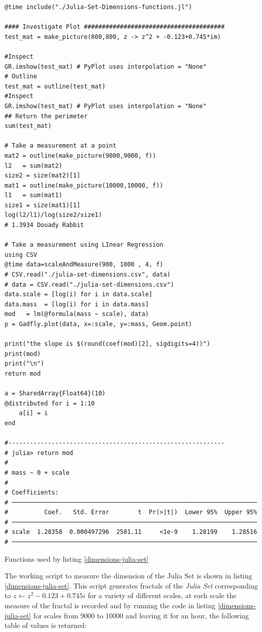 \documentclass[a4paper,11pt,twoside]{article}
\begin{document}
\newpage
\begin{listing}[htbp]
\begin{verbatim}
@time include("./Julia-Set-Dimensions-functions.jl")

#### Investigate Plot #######################################
test_mat = make_picture(800,800, z -> z^2 + -0.123+0.745*im)

#Inspect
GR.imshow(test_mat) # PyPlot uses interpolation = "None"
# Outline
test_mat = outline(test_mat)
#Inspect
GR.imshow(test_mat) # PyPlot uses interpolation = "None"
## Return the perimeter
sum(test_mat)

# Take a measurement at a point
mat2 = outline(make_picture(9000,9000, f))
l2   = sum(mat2)
size2 = size(mat2)[1]
mat1 = outline(make_picture(10000,10000, f))
l1   = sum(mat1)
size1 = size(mat1)[1]
log(l2/l1)/log(size2/size1)
# 1.3934 Douady Rabbit

# Take a measurement using LInear Regression
using CSV
@time data=scaleAndMeasure(900, 1000 , 4, f)
# CSV.read("./julia-set-dimensions.csv", data)
# data = CSV.read("./julia-set-dimensions.csv")
data.scale = [log(i) for i in data.scale]
data.mass  = [log(i) for i in data.mass]
mod   = lm(@formula(mass ~ scale), data)
p = Gadfly.plot(data, x=:scale, y=:mass, Geom.point)

print("the slope is $(round(coef(mod)[2], sigdigits=4))")
print(mod)
print("\n")
return mod

a = SharedArray{Float64}(10)
@distributed for i = 1:10
    a[i] = i
end

#------------------------------------------------------------
# julia> return mod
#
# mass ~ 0 + scale
#
# Coefficients:
# ────────────────────────────────────────────────────────────────────
#          Coef.   Std. Error        t  Pr(>|t|)  Lower 95%  Upper 95%
# ────────────────────────────────────────────────────────────────────
# scale  1.28358  0.000497296  2581.11     <1e-9    1.28199    1.28516
# ────────────────────────────────────────────────────────────────────

\end{verbatim}
\caption{\label{dimensions-julia-set}Functions used by listing \ref{dimensions-julia-set}}
\end{listing}

The working script to measure the dimension of the Julia Set is shown in listing
\ref{dimensions-julia-set}. This script generates fractals of the \emph{Julia Set}
corresponding to \(z \leftarrow z^{2} -0.123+0.745i\) for a variety of different
scales, at each scale the measure of the fractal is recorded and by running the code in listing \ref{dimensions-julia-set}
for scales from 9000 to 10000 and leaving it for an hour, the following
table of values is returned:
\end{document}
